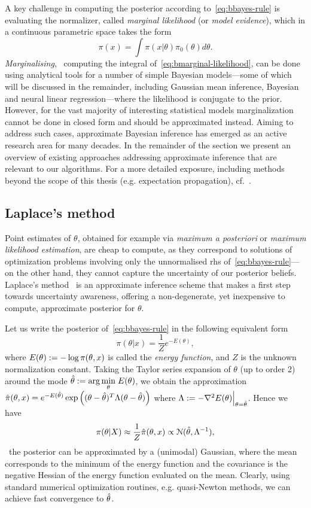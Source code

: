 A key challenge in computing the posterior according to~\cref{eq:bbayes-rule} is evaluating the normalizer, called \emph{marginal likelihood} (or \emph{model evidence}), which in a continuous parametric space takes the form
\[
\pi(x) = \int \pi(x|\theta) \pi_0(\theta) d\theta.
\label{eq:bmarginal-likelihood}
\]
\emph{Marginalising}, \ie~computing the integral of~\cref{eq:bmarginal-likelihood}, can be done using analytical tools for a number of simple Bayesian models---some of which will be discussed in the remainder, including Gaussian mean inference, Bayesian and neural linear regression---where the likelihood is conjugate to the prior. However, for the vast majority of interesting statistical models marginalization cannot be done in closed form and should be approximated instead. Aiming to address such cases, approximate Bayesian inference has emerged as an active research area for many decades. In the remainder of the section we present an overview of existing approaches addressing approximate inference that are relevant to our algorithms. For a more detailed exposure, including methods beyond the scope of this thesis (e.g. expectation propagation), cf.~\citep{bishop06,murphy12,angelino16}.

\subsection{Laplace's method}
\label{subsec:b-laplace-method}

Point estimates of $\theta$, obtained for example via \emph{maximum a posteriori} or \emph{maximum likelihood estimation}, are cheap to compute, as they correspond to solutions of optimization problems involving only the unnormalised rhs of~\cref{eq:bbayes-rule}---on the other hand, they cannot capture the uncertainty of our posterior beliefs. Laplace's method~\citep{mackay03} is an approximate inference scheme that makes a first step towards uncertainty awareness, offering a non-degenerate, yet inexpensive to compute, approximate posterior for $\theta$.

Let us write the posterior of~\cref{eq:bbayes-rule} in the following equivalent form
\[
\pi(\theta|x) = \frac{1}{Z} e^{-E(\theta)},
\]
where $E(\theta) := - \log \pi(\theta, x)$ is called the \emph{energy function}, and $ Z $ is the unknown normalization constant. Taking the Taylor series expansion of $\theta$ (up to order 2) around the mode $ {\hat{\theta} := \arg \underset{\theta}{\min} \;E(\theta)}$, we obtain the approximation 
$ \hat{\pi}(\theta, x) = e^{-E(\hat{\theta})}\exp\left((\theta - \hat{\theta})^T\Lambda (\theta - \hat{\theta})\right)$ where  $ \Lambda := -\nabla^2 E(\theta)\Big|_{\theta = \hat{\theta}}$.
Hence we have
\[
\pi(\theta|X) \approx \frac{1}{Z}   \hat{\pi}(\theta, x)  \propto \mathcal{N}(\hat{\theta}, \Lambda^{-1}), 
\label{eq:blaplace-approx}
\]  
\ie~the posterior can be approximated by a (unimodal) Gaussian, where the mean corresponds to the minimum of the energy function and the covariance is the negative Hessian of the energy function evaluated on the mean. Clearly, using standard numerical optimization routines, e.g. quasi-Newton methods, we can achieve fast convergence to $\hat{\theta}$. 

